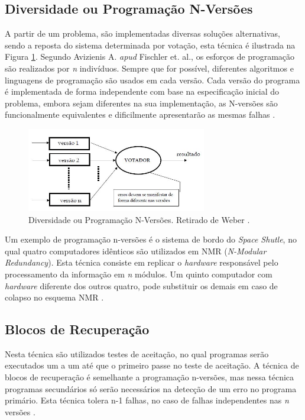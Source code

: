 \subsection{Diversidade ou Programação N-Versões}

A partir de um problema, são implementadas diversas soluções alternativas, sendo a reposta do sistema determinada por votação, esta técnica é ilustrada na Figura \ref{Img:nVersion}. Segundo Avizienis \cite{Avizienis:1995} A. \textit{apud} Fischler et. al., os esforços de programação são realizados por \textit{n} indivíduos. Sempre que for possível, diferentes algoritmos e linguagens de programação são usados em cada versão. Cada versão do programa é implementada de forma independente com base na especificação inicial do problema, embora sejam diferentes na sua implementação, as N-versões são funcionalmente equivalentes e dificilmente apresentarão as mesmas falhas \cite{Avizienis:1995}. 

\begin{figure}[H]
	\centering
	\includegraphics[width=0.7\textwidth]{figuras/nVersions.jpg}
	\caption[Programação N-Versões]{Diversidade ou Programação N-Versões. Retirado de Weber \cite{Weber:2002}.}
	\label{Img:nVersion}	
\end{figure}  

Um exemplo de programação n-versões é o sistema de bordo do \textit{Space Shutle}, no qual quatro computadores idênticos são utilizados em NMR (\textit{N-Modular Redundancy}). Esta técnica consiste em replicar o \textit{hardware} responsável pelo processamento da informação em \textit{n} módulos. Um quinto computador com \textit{hardware} diferente dos outros quatro, pode substituir os demais em caso de colapso no esquema NMR \cite{Pradhan:1996}.

\subsection{Blocos de Recuperação}

Nesta técnica são utilizados testes de aceitação, no qual programas serão executados um a um até que o primeiro passe no teste de aceitação. A técnica de blocos de recuperação é semelhante a programação n-versões, mas nessa técnica programas secundários só serão necessários na detecção de um erro no programa primário. Esta técnica tolera n-1 falhas, no caso de falhas independentes nas \textit{n} versões \cite{Nelson:1990, Weber:2002, Somani:1997}.   

